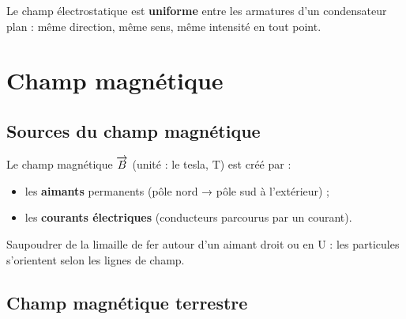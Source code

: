 \begin{illus}
\end{illus}

\begin{aretenir}
Le champ électrostatique est \textbf{uniforme} entre les armatures d’un condensateur plan : même direction, même sens, même intensité en tout point.
\end{aretenir}

\section{Champ magnétique}

\subsection{Sources du champ magnétique}

Le champ magnétique $\overrightarrow{B}$ (unité : le tesla, $\si{\tesla}$) est créé par :
\begin{itemize}
\item les \textbf{aimants} permanents (pôle nord → pôle sud à l’extérieur) ;
\item les \textbf{courants électriques} (conducteurs parcourus par un courant).
\end{itemize}

\begin{experience}
Saupoudrer de la limaille de fer autour d’un aimant droit ou en U : les particules s’orientent selon les lignes de champ.
\end{experience}


\subsection{Champ magnétique terrestre}

